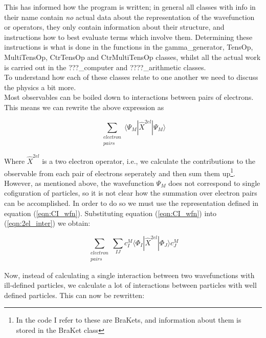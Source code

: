 \documentclass[12pt]{article}
\begin{document}
This has informed how the program is written; in general all classes with info
in their name contain \emph{no} actual data about the representation of the wavefunction or operators,
they only contain information about their structure, and instructions how to best evaluate 
terms which involve them. Determining these instructions is what is done in the functions in the
gamma\_generator, TensOp, MultiTensOp, CtrTensOp and CtrMultiTensOp classes, whilst all the actual
work is carried out in the ???\_computer and ????\_arithmetic classes.\\

To understand how each of these classes relate to one another we need to discuss the physics a bit more.\\

Most observables can be boiled down to interactions between pairs of electrons. This means we can rewrite the above expression as

\begin{equation}
\sum_{\substack{electron \\ pairs}} \langle \Psi_{M} | \hat{X}^{2el}| \Psi_{M} \rangle
\label{eqn:2el_inter}
\end{equation}

Where $\hat{X}^{2el}$ is a two electron operator, i.e., we calculate the
contributions to the observable from each pair of electrons seperately and then
sum them up\footnote{In the code I refer to these are BraKets, and information about them
is stored in the BraKet class}.\\ 

However, as mentioned above, the wavefunction $\Psi_{M}$ does not
correspond to single cofiguration of particles, so it is not clear how the
summation over electron pairs can be accomplished. In order to do so we must
use the representation defined in equation (\ref{eqn:CI_wfn}). Substituting
equation (\ref{eqn:CI_wfn}) into (\ref{eqn:2el_inter}) we obtain:

\begin{equation}
\sum_{\substack{electron \\ pairs}}\sum_{IJ}
 c^{M}_{I}\langle \Phi_{I} | \hat{X}^{2el} | \Phi_{J} \rangle c_{J}^{M}
\label{eqn:2el_inter_2}
\end{equation}

Now, instead of calculating a single interaction between two wavefunctions with ill-defined particles,
we calculate a lot of interactions between particles with well defined particles. This can now be rewritten: 
\end{document}
